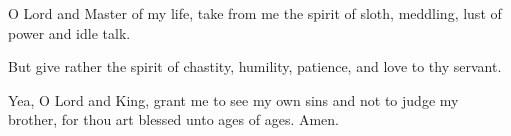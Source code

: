 O Lord and Master of my life, take from me the spirit of sloth, meddling, lust of power and idle talk. 

But give rather the spirit of chastity, humility, patience, and love to thy servant. 

Yea, O Lord and King, grant me to see my own sins and not to judge my brother, for thou art blessed unto ages of ages. Amen. 
